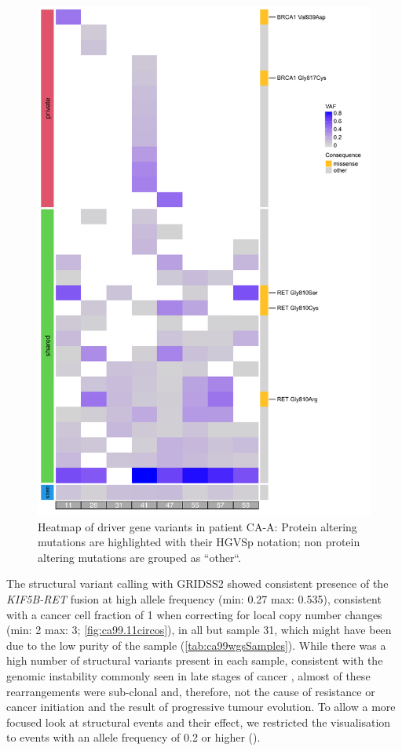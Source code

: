\begin{figure}[htp]
\centering
\includegraphics[width=.99\linewidth]{Figures/CASCADE/CA99/CA99varHeatmap.pdf}
\caption[Heatmap of driver gene variants in patient CA-A]{Heatmap of driver gene variants in patient CA-A: Protein altering mutations are highlighted with their HGVSp notation; non protein altering mutations are grouped as ``other``.} \label{fig:ca99heatmap}
\end{figure}



The structural variant calling with GRIDSS2 showed  consistent presence of the \textit{KIF5B-RET} fusion at high allele frequency (min: 0.27 max: 0.535), consistent with a cancer cell fraction of 1 when correcting for local copy number changes  (min: 2 max: 3; \autoref{fig:ca99.11circos}), in all but sample 31, which might have been due to the low purity of the sample (\autoref{tab:ca99wgsSamples}). While there was a high number of structural variants present in each sample, consistent with the genomic instability commonly seen in late stages of cancer \cite{Gerstung2020}, almost  of these rearrangements were sub-clonal and, therefore, not the  cause of resistance or cancer initiation and  the result of progressive tumour evolution. To allow a more focused look at structural events and their effect, we restricted the visualisation to events with an allele frequency of 0.2 or higher ().

